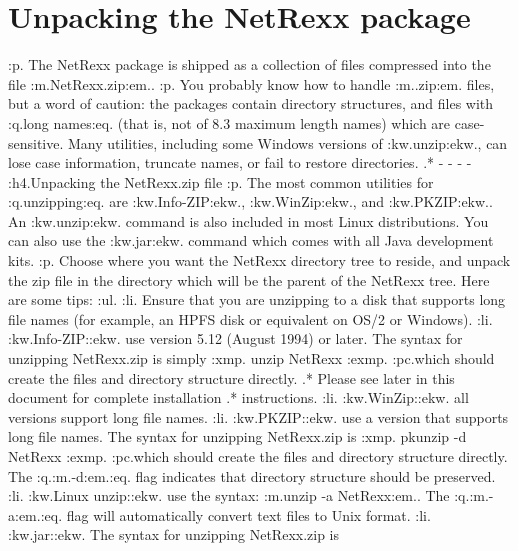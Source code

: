 \chapter{Unpacking the NetRexx package}
:p.
The NetRexx package is shipped as a collection of files compressed into
the file :m.NetRexx.zip:em..
:p.
You probably know how to handle :m..zip:em. files, but a word of
caution: the packages contain directory structures, and files with
:q.long names:eq. (that is, not of 8.3 maximum length names) which are
case-sensitive.  Many utilities, including some Windows versions of
:kw.unzip:ekw., can lose case information, truncate names, or fail to
restore directories.
.* - - - -
:h4.Unpacking the NetRexx.zip file
:p.
The most common utilities for :q.unzipping:eq. are :kw.Info-ZIP:ekw.,
:kw.WinZip:ekw., and :kw.PKZIP:ekw..  An :kw.unzip:ekw. command is also
included in most Linux distributions.
You can also use the :kw.jar:ekw. command which comes with all Java
development kits.
:p.
Choose where you want the NetRexx directory tree to reside, and unpack
the zip file in the directory which will be the parent of the NetRexx
tree.
Here are some tips:
:ul.
:li.
Ensure that you are unzipping to a disk that supports long file names
(for example, an HPFS disk or equivalent on OS/2 or Windows).
:li.
:kw.Info-ZIP::ekw. use version 5.12 (August 1994) or later.  The syntax for
unzipping NetRexx.zip is simply
:xmp.
unzip NetRexx
:exmp.
:pc.which should create the files and directory structure directly.
.* Please see later in this document for complete installation
.* instructions.
:li.
:kw.WinZip::ekw. all versions support long file names.
:li.
:kw.PKZIP::ekw. use a version that supports long file names.  The syntax
for unzipping NetRexx.zip is
:xmp.
pkunzip -d NetRexx
:exmp.
:pc.which should create the files and directory structure directly.  The
:q.:m.-d:em.:eq. flag indicates that directory structure should be
preserved.
:li.
:kw.Linux unzip::ekw. use the syntax: :m.unzip -a NetRexx:em..  The
:q.:m.-a:em.:eq. flag will automatically convert text files to Unix
format.
:li.
:kw.jar::ekw. The syntax for unzipping NetRexx.zip is
